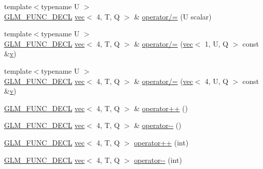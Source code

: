 \begin{DoxyCompactItemize}
\item 
{\footnotesize template$<$typename U $>$ }\\\mbox{\hyperlink{setup_8hpp_ab2d052de21a70539923e9bcbf6e83a51}{G\+L\+M\+\_\+\+F\+U\+N\+C\+\_\+\+D\+E\+CL}} \mbox{\hyperlink{structglm_1_1vec}{vec}}$<$ 4, T, Q $>$ \& \mbox{\hyperlink{structglm_1_1vec_3_014_00_01_t_00_01_q_01_4_a986552cf3068f2573edbcc4f203f1902}{operator/=}} (U scalar)
\item 
{\footnotesize template$<$typename U $>$ }\\\mbox{\hyperlink{setup_8hpp_ab2d052de21a70539923e9bcbf6e83a51}{G\+L\+M\+\_\+\+F\+U\+N\+C\+\_\+\+D\+E\+CL}} \mbox{\hyperlink{structglm_1_1vec}{vec}}$<$ 4, T, Q $>$ \& \mbox{\hyperlink{structglm_1_1vec_3_014_00_01_t_00_01_q_01_4_aa1b32778dee89d5111b478d6c95a654d}{operator/=}} (\mbox{\hyperlink{structglm_1_1vec}{vec}}$<$ 1, U, Q $>$ const \&\mbox{\hyperlink{_s_d_l__opengl_8h_a10a82eabcb59d2fcd74acee063775f90}{v}})
\item 
{\footnotesize template$<$typename U $>$ }\\\mbox{\hyperlink{setup_8hpp_ab2d052de21a70539923e9bcbf6e83a51}{G\+L\+M\+\_\+\+F\+U\+N\+C\+\_\+\+D\+E\+CL}} \mbox{\hyperlink{structglm_1_1vec}{vec}}$<$ 4, T, Q $>$ \& \mbox{\hyperlink{structglm_1_1vec_3_014_00_01_t_00_01_q_01_4_aba90aef1a5d08c44f2ca6be9684bf1cd}{operator/=}} (\mbox{\hyperlink{structglm_1_1vec}{vec}}$<$ 4, U, Q $>$ const \&\mbox{\hyperlink{_s_d_l__opengl_8h_a10a82eabcb59d2fcd74acee063775f90}{v}})
\item 
\mbox{\hyperlink{setup_8hpp_ab2d052de21a70539923e9bcbf6e83a51}{G\+L\+M\+\_\+\+F\+U\+N\+C\+\_\+\+D\+E\+CL}} \mbox{\hyperlink{structglm_1_1vec}{vec}}$<$ 4, T, Q $>$ \& \mbox{\hyperlink{structglm_1_1vec_3_014_00_01_t_00_01_q_01_4_a8729def59c3f8b14075332c8603dd5c7}{operator++}} ()
\item 
\mbox{\hyperlink{setup_8hpp_ab2d052de21a70539923e9bcbf6e83a51}{G\+L\+M\+\_\+\+F\+U\+N\+C\+\_\+\+D\+E\+CL}} \mbox{\hyperlink{structglm_1_1vec}{vec}}$<$ 4, T, Q $>$ \& \mbox{\hyperlink{structglm_1_1vec_3_014_00_01_t_00_01_q_01_4_a1aa18c4fcac90cabb4f8cb2e467d4d9f}{operator-\/-\/}} ()
\item 
\mbox{\hyperlink{setup_8hpp_ab2d052de21a70539923e9bcbf6e83a51}{G\+L\+M\+\_\+\+F\+U\+N\+C\+\_\+\+D\+E\+CL}} \mbox{\hyperlink{structglm_1_1vec}{vec}}$<$ 4, T, Q $>$ \mbox{\hyperlink{structglm_1_1vec_3_014_00_01_t_00_01_q_01_4_a622a107338ed3355458bf43b9e078b7b}{operator++}} (int)
\item 
\mbox{\hyperlink{setup_8hpp_ab2d052de21a70539923e9bcbf6e83a51}{G\+L\+M\+\_\+\+F\+U\+N\+C\+\_\+\+D\+E\+CL}} \mbox{\hyperlink{structglm_1_1vec}{vec}}$<$ 4, T, Q $>$ \mbox{\hyperlink{structglm_1_1vec_3_014_00_01_t_00_01_q_01_4_ae095dbcd5c299033774aef2f534e9a26}{operator-\/-\/}} (int)

\end{DoxyCompactItemize}
